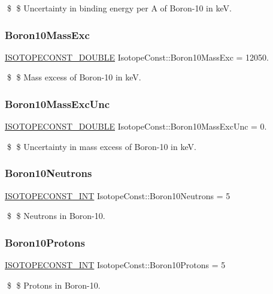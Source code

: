 \$ \$ Uncertainty in binding energy per A of Boron-\/10 in keV. \mbox{\label{group___isotope_const-_boron-_b10_gaf3eaa4df1df3798a8d131f475512b2a9}} 
\subsubsection{\texorpdfstring{Boron10\+Mass\+Exc}{Boron10MassExc}}
{\footnotesize\ttfamily \mbox{\hyperlink{group___isotope_const-_macros_ga8f45a7272ce02c0b4c65c44636ed719a}{I\+S\+O\+T\+O\+P\+E\+C\+O\+N\+S\+T\+\_\+\+D\+O\+U\+B\+LE}} Isotope\+Const\+::\+Boron10\+Mass\+Exc = 12050.}

\$ \$ Mass excess of Boron-\/10 in keV. \mbox{\label{group___isotope_const-_boron-_b10_ga58eab26f9c75bc1b1ee5dd1da19ef359}} 
\subsubsection{\texorpdfstring{Boron10\+Mass\+Exc\+Unc}{Boron10MassExcUnc}}
{\footnotesize\ttfamily \mbox{\hyperlink{group___isotope_const-_macros_ga8f45a7272ce02c0b4c65c44636ed719a}{I\+S\+O\+T\+O\+P\+E\+C\+O\+N\+S\+T\+\_\+\+D\+O\+U\+B\+LE}} Isotope\+Const\+::\+Boron10\+Mass\+Exc\+Unc = 0.}

\$ \$ Uncertainty in mass excess of Boron-\/10 in keV. \mbox{\label{group___isotope_const-_boron-_b10_ga3446d8f22510fdea0d9fad50ace7c3e2}} 
\subsubsection{\texorpdfstring{Boron10\+Neutrons}{Boron10Neutrons}}
{\footnotesize\ttfamily \mbox{\hyperlink{group___isotope_const-_macros_ga5f18360b3e99483a35c32d789e62621c}{I\+S\+O\+T\+O\+P\+E\+C\+O\+N\+S\+T\+\_\+\+I\+NT}} Isotope\+Const\+::\+Boron10\+Neutrons = 5}

\$ \$ Neutrons in Boron-\/10. \mbox{\label{group___isotope_const-_boron-_b10_gabef59d78e62ce86a448f449712e0e660}} 
\subsubsection{\texorpdfstring{Boron10\+Protons}{Boron10Protons}}
{\footnotesize\ttfamily \mbox{\hyperlink{group___isotope_const-_macros_ga5f18360b3e99483a35c32d789e62621c}{I\+S\+O\+T\+O\+P\+E\+C\+O\+N\+S\+T\+\_\+\+I\+NT}} Isotope\+Const\+::\+Boron10\+Protons = 5}

\$ \$ Protons in Boron-\/10. 